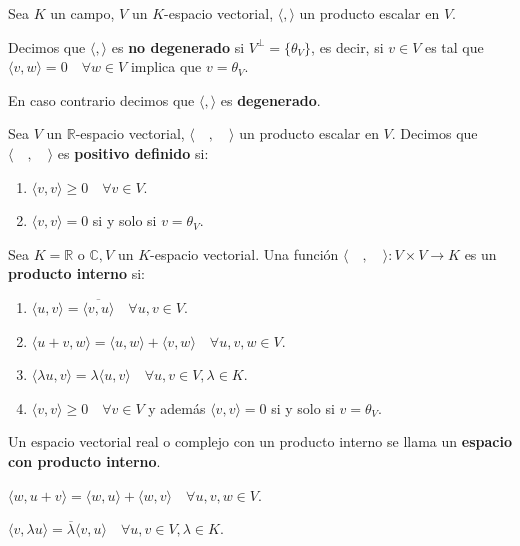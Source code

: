 \begin{definition}{}{}
    Sea $K$ un campo, $V$ un $K$-espacio vectorial, $\langle , \rangle$ un producto escalar en $V$.

    Decimos que $\langle , \rangle$ es \textbf{no degenerado} si $V^{\perp} = \{ \theta_V \}$, es decir, si $v \in V$ es tal que $\langle v, w \rangle = 0 \quad \forall w \in V$ implica que $ v = \theta_V$.

    En caso contrario decimos que $\langle , \rangle$ es \textbf{degenerado}.
\end{definition}
\begin{definition}{}{}
    Sea $V$ un $\mathbb{R}$-espacio vectorial, $\langle \quad, \quad \rangle$ un producto escalar en $V$. Decimos que $\langle \quad, \quad \rangle$ es \textbf{positivo definido} si:
    \begin{enumerate}
        \item $\langle v,v \rangle \geq 0 \quad \forall v \in V$.
        \item $\langle v,v \rangle = 0$ si y solo si $v = \theta_V$.
    \end{enumerate}
\end{definition}
\begin{definition}{}{}
    Sea $K = \mathbb{R}$ o $\mathbb{C}, V$ un $K$-espacio vectorial. Una función $\langle \quad, \quad \rangle: V \times V \rightarrow K$ es un \textbf{producto interno} si:
    \begin{enumerate}
        \item $\langle u,v \rangle = \overline{\langle v,u \rangle} \quad \forall u,v \in V$.
        \item $\langle u + v, w \rangle = \langle u,w \rangle + \langle v,w \rangle \quad \forall u,v,w \in V$.
        \item $\langle \lambda u, v \rangle = \lambda \langle u,v \rangle \quad \forall u,v \in V, \lambda \in K$.
        \item $\langle v,v \rangle \geq 0 \quad \forall v \in V$ y además $\langle v,v \rangle = 0$ si y solo si $v = \theta_V$.
    \end{enumerate}
    Un espacio vectorial real o complejo con un producto interno se llama un  \textbf{espacio con producto interno}.
\end{definition}
\begin{obs}{}{}
    $\langle w, u + v \rangle = \langle w,u \rangle + \langle w,v \rangle \quad \forall u,v,w \in V$.
\end{obs}
\begin{obs}{}{}
    $\langle v, \lambda u \rangle = \overline{\lambda} \langle v,u \rangle \quad \forall u,v \in V, \lambda \in K$.
\end{obs}
